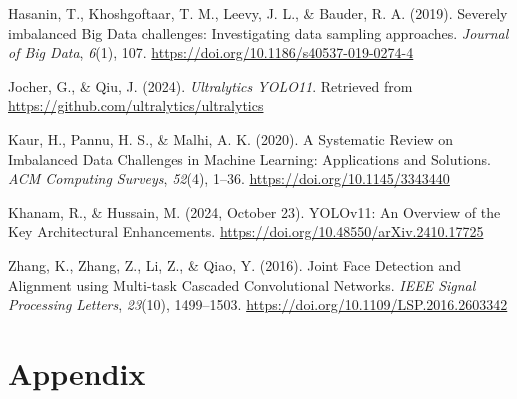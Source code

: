 \documentclass[
  man,floatsintext]{apa6}
\newlength{\cslhangindent}
\newenvironment{CSLReferences}[2] %
 {\begin{list}{}{%
  \setlength{\itemindent}{0pt}
  \setlength{\leftmargin}{0pt}
  \setlength{\parsep}{0pt}
  \ifodd #1
   \setlength{\leftmargin}{\cslhangindent}
   \setlength{\itemindent}{-1\cslhangindent}
  \fi
  \setlength{\itemsep}{#2\baselineskip}}}
 {\end{list}}
\begin{document}
\label{refs}
\begin{CSLReferences}{1}{0}
Hasanin, T., Khoshgoftaar, T. M., Leevy, J. L., \& Bauder, R. A. (2019). Severely imbalanced {Big Data} challenges: Investigating data sampling approaches. \emph{Journal of Big Data}, \emph{6}(1), 107. \url{https://doi.org/10.1186/s40537-019-0274-4}

Jocher, G., \& Qiu, J. (2024). \emph{Ultralytics {YOLO11}}. Retrieved from \url{https://github.com/ultralytics/ultralytics}

Kaur, H., Pannu, H. S., \& Malhi, A. K. (2020). A {Systematic Review} on {Imbalanced Data Challenges} in {Machine Learning}: {Applications} and {Solutions}. \emph{ACM Computing Surveys}, \emph{52}(4), 1--36. \url{https://doi.org/10.1145/3343440}

Khanam, R., \& Hussain, M. (2024, October 23). {YOLOv11}: {An Overview} of the {Key Architectural Enhancements}. \url{https://doi.org/10.48550/arXiv.2410.17725}

Zhang, K., Zhang, Z., Li, Z., \& Qiao, Y. (2016). Joint {Face Detection} and {Alignment} using {Multi-task Cascaded Convolutional Networks}. \emph{IEEE Signal Processing Letters}, \emph{23}(10), 1499--1503. \url{https://doi.org/10.1109/LSP.2016.2603342}

\end{CSLReferences}

\endgroup

\newpage

\section{Appendix}\label{appendix}
\end{document}
